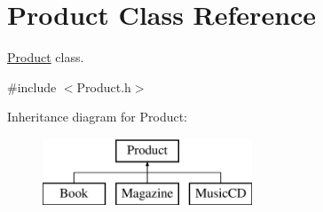 \hypertarget{classProduct}{}\section{Product Class Reference}
\label{classProduct}


\hyperlink{classProduct}{Product} class.  




{\ttfamily \#include $<$Product.\+h$>$}

Inheritance diagram for Product\+:\begin{figure}[H]
\begin{center}
\leavevmode
\includegraphics[height=2.000000cm]{classProduct}
\end{center}
\end{figure}
